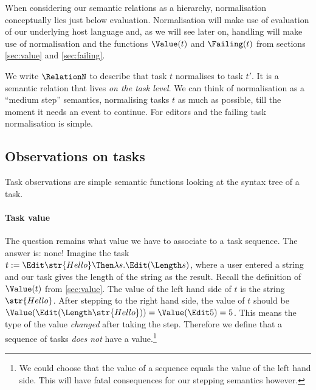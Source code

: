 When considering our semantic relations as a hierarchy,
normalisation conceptually lies just below evaluation.
Normalisation will make use of evaluation of our underlying host language and,
as we will see later on,
handling will make use of normalisation
and the functions $\Value(t)$ and $\Failing(t)$ from sections \autoref{sec:value} and \autoref{sec:failing}.

We write $\RelationN$ to describe that
task $t$ normalises to task $t'$.
It is a semantic relation that lives \emph{on the task level}.
We can think of normalisation as a \enquote{medium step} semantics,
normalising tasks $t$ as much as possible,
till the moment it needs an event to continue.
For editors and the failing task normalisation is simple.



\subsection{Observations on tasks}

Task observations are simple semantic functions looking at the syntax tree of a task.




\paragraph{Task value}

The question remains what value we have to associate to a task sequence.
The answer is: none!
Imagine the task $t := \Edit \str{Hello} \Then \lambda s.\allowbreak\Edit (\Length s)$,
where a user entered a string and our task gives the length of the string as the result.
Recall the definition of $\Value(t)$ from \autoref{sec:value}.
The value of the left hand side of $t$ is the string $\str{Hello}$.
After stepping to the right hand side,
the value of $t$ should be $\Value(\Edit (\Length\str{Hello})) = \Value(\Edit 5) = 5$.
This means the type of the value \emph{changed} after taking the step.
Therefore we define that a sequence of tasks \emph{does not} have a value.\footnote{
  We could choose that the value of a sequence equals the value of the left hand side.
  This will have fatal consequences for our stepping semantics however.
}

